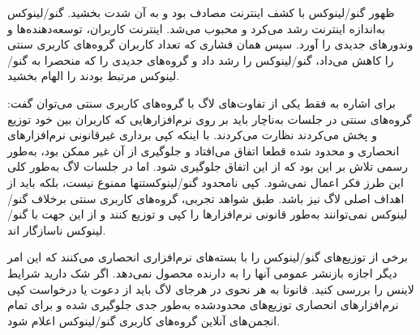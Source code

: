 ظهور گنو/لینوکس با کشف اینترنت مصادف بود و به آن شدت بخشید.
گنو/لینوکس به‌اندازه اینترنت رشد می‌کرد و محبوب می‌شد.
اینترنت کاربران، توسعه‌دهنده‌ها و وندورهای جدیدی را آورد.
سپس همان فشاری که تعداد کاربران گروه‌های کاربری سنتی را کاهش می‌داد،
گنو/لینوکس را رشد داد و گروه‌های جدیدی را که منحصرا به گنو/لینوکس مرتبط بودند
را الهام بخشید.

برای اشاره به فقط یکی از تفاوت‌های لاگ با گروه‌های کاربری سنتی می‌توان گفت:
گروه‌های سنتی در جلسات به‌ناچار باید بر روی نرم‌افزارهایی که کاربران بین خود
توزیع و پخش می‌کردند نظارت می‌کردند. با اینکه کپی برداری غیرقانونی نرم‌افزارهای
انحصاری و محدود شده قطعا اتفاق می‌افتاد و جلوگیری از آن غیر ممکن بود، به‌طور رسمی
تلاش بر این بود که از این اتفاق جلوگیری شود.
اما در جلسات لاگ به‌طور کلی این طرز فکر اعمال نمی‌شود. کپی نامحدود گنو/لینوکستنها ممنوع نیست،
بلکه باید از اهداف اصلی لاگ نیز باشد. طبق شواهد تجربی، گروه‌های کاربری سنتی برخلاف گنو/لینوکس
نمی‌توانند به‌طور قانونی نرم‌افزار‌ها را کپی و توزیع کنند و از این جهت با گنو/لینوکس ناسازگار اند.


\begin{caveat}
برخی از توزیع‌های گنو/لینوکس را با بسته‌های نرم‌افزاری انحصاری
می‌کنند که این امر
دیگر اجازه بازنشر عمومی آنها را به دارنده محصول نمی‌دهد. اگر شک دارید شرایط لاینس را بررسی کنید.
قانونا به هر نحوی در هرجای لاگ باید از دعوت یا درخواست کپی نرم‌افزارهای انحصاری توزیع‌های محدودشده
 به‌طور جدی جلوگیری شده و برای تمام انجمن‌های آنلاین گروه‌های کاربری گنو/لینوکس
اعلام شود.
\end{caveat}




